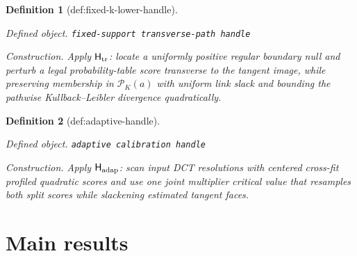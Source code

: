 \documentclass{article}
\newtheorem{definition}{Definition}
\begin{document}
\begin{definition}[def:fixed-k-lower-handle]\label{def:fixed-k-lower-handle}
\par\smallskip\noindent\emph{Defined object.} \texttt{fixed-\allowbreak{}support transverse-\allowbreak{}path handle}
\par\smallskip\noindent\emph{Construction.} Apply \(\mathsf H_{\rm tr}\): locate a uniformly positive regular boundary null and perturb a legal probability-table score transverse to the tangent image, while preserving membership in \(\mathcal P_K(a)\) with uniform link slack and bounding the pathwise Kullback--Leibler divergence quadratically.
\end{definition}

\begin{definition}[def:adaptive-handle]\label{def:adaptive-handle}
\par\smallskip\noindent\emph{Defined object.} \texttt{adaptive calibration handle}
\par\smallskip\noindent\emph{Construction.} Apply \(\mathsf H_{\rm adap}\): scan input DCT resolutions with centered cross-fit profiled quadratic scores and use one joint multiplier critical value that resamples both split scores while slackening estimated tangent faces.
\end{definition}

\section{Main results}
\end{document}
